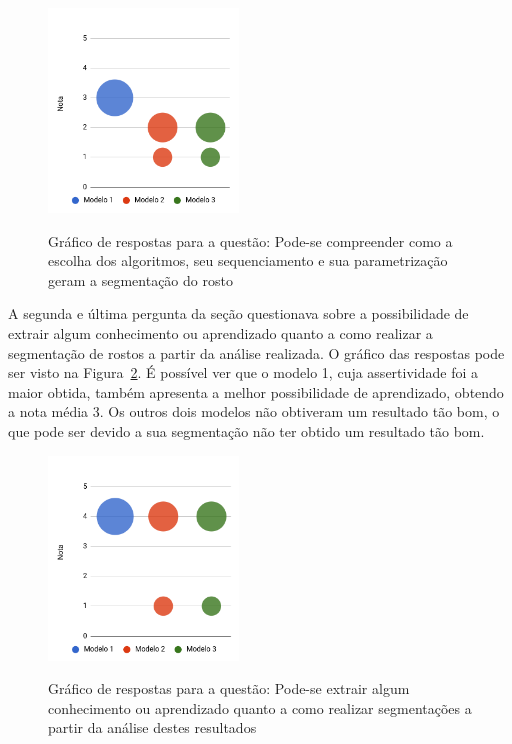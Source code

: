 \documentclass[12pt,oneside,a4paper,english,french,spanish,brazil,]{abntex2}
\begin{document}
\begin{figure}[ht]
\centering
\caption{Gráfico de respostas para a questão: Pode-se compreender como a escolha dos algoritmos, seu sequenciamento e sua parametrização geram a segmentação do rosto}
\includegraphics[width=0.45\textwidth]{imagens/Avaliacao_Juizes/Grafico_10.png}
\sourceAuthor{}
\label{fig:AJ_Qualidade_11}
\end{figure}

A segunda e última pergunta da seção questionava sobre a possibilidade de extrair algum conhecimento ou aprendizado quanto a como realizar a segmentação de rostos a partir da análise realizada. O gráfico das respostas pode ser visto na Figura~\ref{fig:AJ_Qualidade_12}. É possível ver que o modelo 1, cuja assertividade foi a maior obtida, também apresenta a melhor possibilidade de aprendizado, obtendo a nota média 3. Os outros dois modelos não obtiveram um resultado tão bom, o que pode ser devido a sua segmentação não ter obtido um resultado tão bom.

\begin{figure}[ht]
\centering
\caption{Gráfico de respostas para a questão: Pode-se extrair algum conhecimento ou aprendizado quanto a como realizar segmentações a partir da análise destes resultados}
\includegraphics[width=0.45\textwidth]{imagens/Avaliacao_Juizes/Grafico_12.png}
\sourceAuthor{}
\label{fig:AJ_Qualidade_12}
\end{figure}
\end{document}

